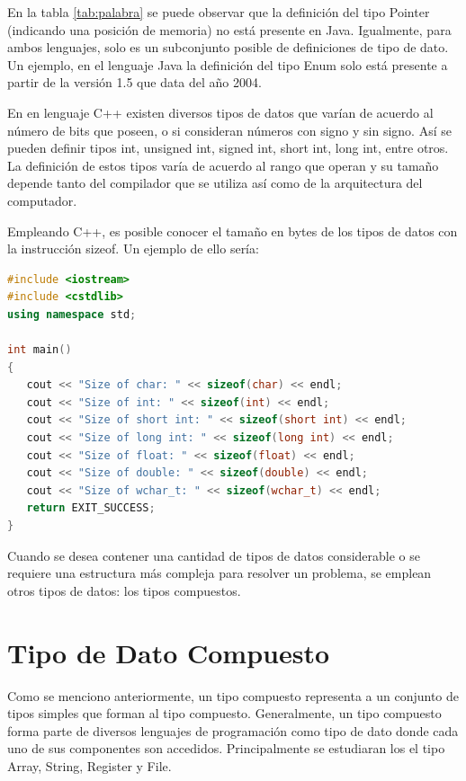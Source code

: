 En la tabla \ref{tab:palabra} se puede observar que la definición del tipo Pointer (indicando una posición de memoria) no está presente en Java. Igualmente, para ambos lenguajes, solo es un subconjunto posible de definiciones de tipo de dato. Un ejemplo, en el lenguaje Java la definición del tipo Enum solo está presente a partir de la versión 1.5 que data del año 2004.

En en lenguaje C++ existen diversos tipos de datos que varían de acuerdo al número de bits que poseen, o si consideran números con signo y sin signo. Así se pueden definir tipos int, unsigned int, signed int, short int, long int, entre otros. La definición de estos tipos varía de acuerdo al rango que operan y su tamaño depende tanto del compilador que se utiliza así como de la arquitectura del computador.

Empleando C++, es posible conocer el tamaño en bytes de los tipos de datos con la instrucción sizeof. Un ejemplo de ello sería:
\begin{lstlisting}[upquote=true, language=C++]
#include <iostream>
#include <cstdlib>
using namespace std;

int main()
{
   cout << "Size of char: " << sizeof(char) << endl;
   cout << "Size of int: " << sizeof(int) << endl;
   cout << "Size of short int: " << sizeof(short int) << endl;
   cout << "Size of long int: " << sizeof(long int) << endl;
   cout << "Size of float: " << sizeof(float) << endl;
   cout << "Size of double: " << sizeof(double) << endl;
   cout << "Size of wchar_t: " << sizeof(wchar_t) << endl;
   return EXIT_SUCCESS;
}
\end{lstlisting}

Cuando se desea contener una cantidad de tipos de datos considerable o se requiere una estructura más compleja para resolver un problema, se emplean otros tipos de datos: los tipos compuestos.

\section{Tipo de Dato Compuesto}

Como se menciono anteriormente, un tipo compuesto representa a un conjunto de tipos simples que forman al tipo compuesto. Generalmente, un tipo compuesto forma parte de diversos lenguajes de programación como tipo de dato donde cada uno de sus componentes son accedidos. Principalmente se estudiaran los el tipo Array, String, Register y File.

